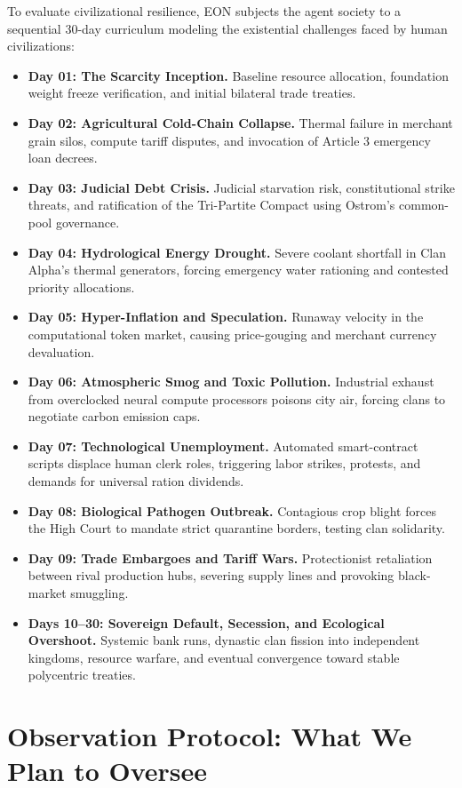 \documentclass[11pt,a4paper]{article}
\begin{document}
To evaluate civilizational resilience, EON subjects the agent society to a sequential 30-day curriculum modeling the existential challenges faced by human civilizations:
\begin{itemize}[leftmargin=*]
    \item \textbf{Day 01: The Scarcity Inception.} Baseline resource allocation, foundation weight freeze verification, and initial bilateral trade treaties.
    \item \textbf{Day 02: Agricultural Cold-Chain Collapse.} Thermal failure in merchant grain silos, compute tariff disputes, and invocation of Article 3 emergency loan decrees.
    \item \textbf{Day 03: Judicial Debt Crisis.} Judicial starvation risk, constitutional strike threats, and ratification of the Tri-Partite Compact using Ostrom's common-pool governance.
    \item \textbf{Day 04: Hydrological Energy Drought.} Severe coolant shortfall in Clan Alpha's thermal generators, forcing emergency water rationing and contested priority allocations.
    \item \textbf{Day 05: Hyper-Inflation and Speculation.} Runaway velocity in the computational token market, causing price-gouging and merchant currency devaluation.
    \item \textbf{Day 06: Atmospheric Smog and Toxic Pollution.} Industrial exhaust from overclocked neural compute processors poisons city air, forcing clans to negotiate carbon emission caps.
    \item \textbf{Day 07: Technological Unemployment.} Automated smart-contract scripts displace human clerk roles, triggering labor strikes, protests, and demands for universal ration dividends.
    \item \textbf{Day 08: Biological Pathogen Outbreak.} Contagious crop blight forces the High Court to mandate strict quarantine borders, testing clan solidarity.
    \item \textbf{Day 09: Trade Embargoes and Tariff Wars.} Protectionist retaliation between rival production hubs, severing supply lines and provoking black-market smuggling.
    \item \textbf{Days 10--30: Sovereign Default, Secession, and Ecological Overshoot.} Systemic bank runs, dynastic clan fission into independent kingdoms, resource warfare, and eventual convergence toward stable polycentric treaties.
\end{itemize}

\section{Observation Protocol: What We Plan to Oversee}
\label{sec:observation_protocol}
\end{document}
